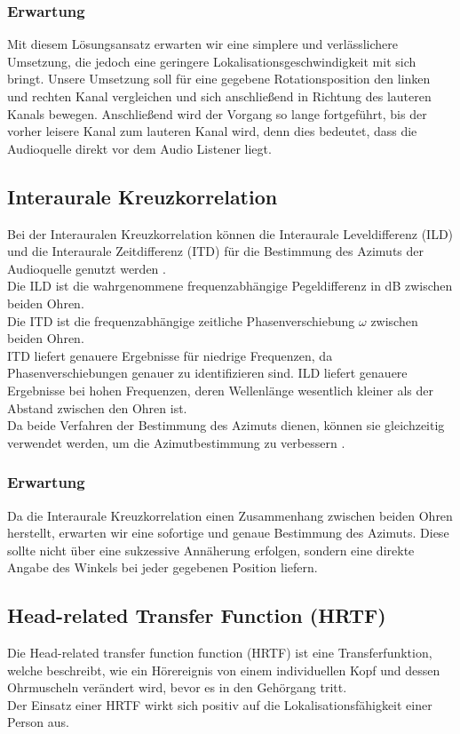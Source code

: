 \documentclass[12pt,a4paper]{article}
\begin{document}
\subsubsection{Erwartung}
Mit diesem Lösungsansatz erwarten wir eine simplere und verlässlichere Umsetzung, die jedoch eine geringere Lokalisationsgeschwindigkeit mit sich bringt.
Unsere Umsetzung soll für eine gegebene Rotationsposition den linken und rechten Kanal vergleichen und sich anschließend in Richtung des lauteren Kanals bewegen. Anschließend wird der Vorgang so lange fortgeführt, bis der vorher leisere Kanal zum lauteren Kanal wird, denn dies bedeutet, dass die Audioquelle direkt vor dem Audio Listener liegt.


\subsection{Interaurale Kreuzkorrelation}
Bei der Interauralen Kreuzkorrelation können die Interaurale Leveldifferenz (ILD) und die Interaurale Zeitdifferenz (ITD) für die Bestimmung des Azimuts der Audioquelle genutzt werden \cite{Fall}.\\
Die ILD ist die wahrgenommene  frequenzabhängige Pegeldifferenz in dB zwischen beiden Ohren.\\ 
Die ITD ist die frequenzabhängige zeitliche Phasenverschiebung \(\omega\) zwischen beiden Ohren.\\
ITD liefert genauere Ergebnisse für niedrige Frequenzen, da Phasenverschiebungen genauer zu identifizieren sind. ILD liefert genauere Ergebnisse bei hohen Frequenzen, deren Wellenlänge wesentlich kleiner als der Abstand zwischen den Ohren ist.\\
Da beide Verfahren der Bestimmung des Azimuts dienen, können sie gleichzeitig verwendet werden, um die Azimutbestimmung zu verbessern \cite{Rasp}.

\subsubsection{Erwartung}
Da die Interaurale Kreuzkorrelation einen Zusammenhang zwischen beiden Ohren herstellt, erwarten wir eine sofortige und genaue Bestimmung des Azimuts. Diese sollte nicht über eine sukzessive Annäherung erfolgen, sondern eine direkte Angabe des Winkels bei jeder gegebenen Position liefern.

\subsection{Head-related Transfer Function (HRTF)}
Die Head-related transfer function function (HRTF) ist eine Transferfunktion, welche beschreibt, wie ein Hörereignis von einem individuellen Kopf und dessen Ohrmuscheln verändert wird, bevor es in den Gehörgang tritt.\\
Der Einsatz einer HRTF wirkt sich positiv auf die Lokalisationsfähigkeit einer Person aus.
\end{document}

